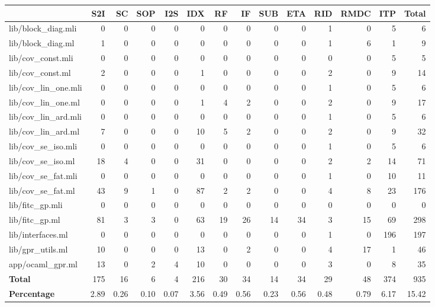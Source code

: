 \begin{tabular}{lrrrrrrrrrrrrr}
  \hline
  & S2I & SC & SOP & I2S & IDX & RF & IF & SUB & ETA & RID & RMDC & ITP & \textbf{Total} \\
  \hline
  lib/block\_diag.mli & 0 & 0 & 0 & 0 & 0 & 0 & 0 & 0 & 0 & 1 & 0 & 5 & 6 \\
  lib/block\_diag.ml & 1 & 0 & 0 & 0 & 0 & 0 & 0 & 0 & 0 & 1 & 6 & 1 & 9 \\
  lib/cov\_const.mli & 0 & 0 & 0 & 0 & 0 & 0 & 0 & 0 & 0 & 0 & 0 & 5 & 5 \\
  lib/cov\_const.ml & 2 & 0 & 0 & 0 & 1 & 0 & 0 & 0 & 0 & 2 & 0 & 9 & 14 \\
  lib/cov\_lin\_one.mli & 0 & 0 & 0 & 0 & 0 & 0 & 0 & 0 & 0 & 1 & 0 & 5 & 6 \\
  lib/cov\_lin\_one.ml & 0 & 0 & 0 & 0 & 1 & 4 & 2 & 0 & 0 & 2 & 0 & 9 & 17 \\
  lib/cov\_lin\_ard.mli & 0 & 0 & 0 & 0 & 0 & 0 & 0 & 0 & 0 & 1 & 0 & 5 & 6 \\
  lib/cov\_lin\_ard.ml & 7 & 0 & 0 & 0 & 10 & 5 & 2 & 0 & 0 & 2 & 0 & 9 & 32 \\
  lib/cov\_se\_iso.mli & 0 & 0 & 0 & 0 & 0 & 0 & 0 & 0 & 0 & 1 & 0 & 5 & 6 \\
  lib/cov\_se\_iso.ml & 18 & 4 & 0 & 0 & 31 & 0 & 0 & 0 & 0 & 2 & 2 & 14 & 71 \\
  lib/cov\_se\_fat.mli & 0 & 0 & 0 & 0 & 0 & 0 & 0 & 0 & 0 & 1 & 0 & 10 & 11 \\
  lib/cov\_se\_fat.ml & 43 & 9 & 1 & 0 & 87 & 2 & 2 & 0 & 0 & 4 & 8 & 23 & 176 \\
  lib/fitc\_gp.mli & 0 & 0 & 0 & 0 & 0 & 0 & 0 & 0 & 0 & 0 & 0 & 0 & 0 \\
  lib/fitc\_gp.ml & 81 & 3 & 3 & 0 & 63 & 19 & 26 & 14 & 34 & 3 & 15 & 69 & 298 \\
  lib/interfaces.ml & 0 & 0 & 0 & 0 & 0 & 0 & 0 & 0 & 0 & 1 & 0 & 196 & 197 \\
  lib/gpr\_utils.ml & 10 & 0 & 0 & 0 & 13 & 0 & 2 & 0 & 0 & 4 & 17 & 1 & 46 \\
  app/ocaml\_gpr.ml & 13 & 0 & 2 & 4 & 10 & 0 & 0 & 0 & 0 & 3 & 0 & 8 & 35 \\
  \hline
  \textbf{Total} & 175 & 16 & 6 & 4 & 216 & 30 & 34 & 14 & 34 & 29 & 48 & 374 & 935 \\
  \textbf{Percentage} & 2.89 & 0.26 & 0.10 & 0.07 & 3.56 & 0.49 & 0.56 & 0.23 & 0.56 & 0.48 & 0.79 & 6.17 & 15.42 \\
  \hline
  \end{tabular}
